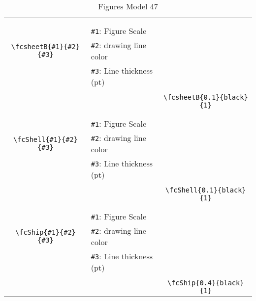 \documentclass[x11names]{article}
\begin{document}
\begin{table}[H]
\begin{tabular}{|c|l|c|}
	&&\multirow{5}{*}{\fcsheetB{0.1}{black}{1}}\\	&&\\	&\verb|#1|: Figure Scale &\\	\verb|\fcsheetB{#1}{#2}{#3}|&	\verb|#2|: drawing line color &\\	&\verb|#3|: Line thickness (pt) &\\ &&\\&&	\verb|\fcsheetB{0.1}{black}{1}|\\\hline 	
	&&\multirow{5}{*}{\fcShell{0.1}{black}{1}}\\	&&\\	&\verb|#1|: Figure Scale &\\	\verb|\fcShell{#1}{#2}{#3}|&	\verb|#2|: drawing line color &\\	&\verb|#3|: Line thickness (pt) &\\ &&\\&&	\verb|\fcShell{0.1}{black}{1}|\\\hline 	
	&&\multirow{5}{*}{\fcShip{0.4}{black}{1}}\\	&&\\	&\verb|#1|: Figure Scale &\\	\verb|\fcShip{#1}{#2}{#3}|&	\verb|#2|: drawing line color &\\	&\verb|#3|: Line thickness (pt) &\\ &&\\&&	\verb|\fcShip{0.4}{black}{1}|\\\hline 	\hline\end{tabular}\caption{Figures Model 47}\label{tab47}\end{table}
\end{document}
